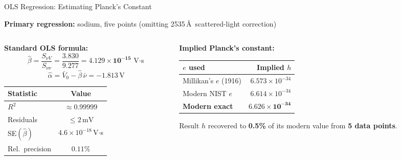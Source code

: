 \documentclass[aspectratio=169,12pt]{beamer}
\begin{document}
\begin{frame}[shrink=5]{OLS Regression: Estimating Planck's Constant}

\textbf{Primary regression:} sodium, five points (omitting 2535\,\AA\ scattered-light correction)

\medskip
\begin{columns}[T]
\begin{column}{0.48\textwidth}
\textbf{Standard OLS formula:}
\[
  \hat\beta = \frac{S_{\nu V}}{S_{\nu\nu}}
            = \frac{3.830}{9.277}
            = \mathbf{4.129\times10^{-15}}\,\text{V$\cdot$s}
\]
\[
  \hat\alpha = \bar V_0 - \hat\beta\,\bar\nu = -1.813\,\text{V}
\]

\medskip
\begin{tabular}{lc}
\toprule
Statistic & Value \\
\midrule
$R^2$ & $\approx 0.99999$ \\
Residuals & $\leq 2\,\mathrm{mV}$ \\
SE$(\hat\beta)$ & $4.6\times10^{-18}$\,V$\cdot$s \\
Rel.\ precision & $\mathbf{0.11\%}$ \\
\bottomrule
\end{tabular}
\end{column}
\begin{column}{0.48\textwidth}
\textbf{Implied Planck's constant:}

\medskip
\begin{tabular}{p{3.2cm}r}
\toprule
$e$ used & Implied $h$ \\
\midrule
Millikan's $e$ (1916) & $6.573\times10^{-34}$ \\
Modern NIST $e$ & $6.614\times10^{-34}$ \\
\midrule
\textbf{Modern exact} & $\mathbf{6.626\times10^{-34}}$ \\
\bottomrule
\end{tabular}

\medskip
\begin{alertblock}{Result}
$h$ recovered to \textbf{0.5\%} of its
modern value from \textbf{5 data points}.
\end{alertblock}
\end{column}
\end{columns}

\end{frame}
\end{document}
